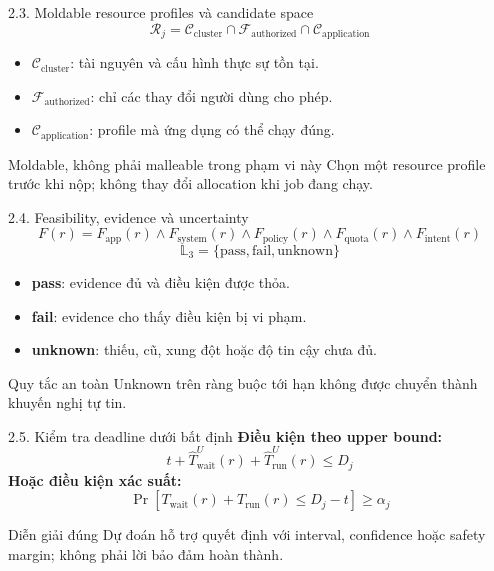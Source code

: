 \begin{frame}[t]{2.3. Moldable resource profiles và candidate space}
\small
\[
\mathcal{R}_j=
\mathcal{C}_{\mathrm{cluster}}
\cap
\mathcal{F}_{\mathrm{authorized}}
\cap
\mathcal{C}_{\mathrm{application}}
\]
\begin{itemize}
  \item $\mathcal{C}_{\mathrm{cluster}}$: tài nguyên và cấu hình thực sự tồn tại.
  \item $\mathcal{F}_{\mathrm{authorized}}$: chỉ các thay đổi người dùng cho phép.
  \item $\mathcal{C}_{\mathrm{application}}$: profile mà ứng dụng có thể chạy đúng.
\end{itemize}
\begin{block}{Moldable, không phải malleable trong phạm vi này}
Chọn một resource profile trước khi nộp; không thay đổi allocation khi job đang chạy.
\end{block}
\end{frame}

\begin{frame}[t]{2.4. Feasibility, evidence và uncertainty}
\small
\[
F(r)=F_{\mathrm{app}}(r)\land F_{\mathrm{system}}(r)\land
F_{\mathrm{policy}}(r)\land F_{\mathrm{quota}}(r)\land F_{\mathrm{intent}}(r)
\]
\[
\mathbb{L}_3=\{\mathrm{pass},\mathrm{fail},\mathrm{unknown}\}
\]
\begin{itemize}
  \item \textbf{pass}: evidence đủ và điều kiện được thỏa.
  \item \textbf{fail}: evidence cho thấy điều kiện bị vi phạm.
  \item \textbf{unknown}: thiếu, cũ, xung đột hoặc độ tin cậy chưa đủ.
\end{itemize}
\begin{alertblock}{Quy tắc an toàn}
Unknown trên ràng buộc tới hạn không được chuyển thành khuyến nghị tự tin.
\end{alertblock}
\end{frame}

\begin{frame}[t]{2.5. Kiểm tra deadline dưới bất định}
\small
\textbf{Điều kiện theo upper bound:}
\[
t+\widehat{T}_{\mathrm{wait}}^{U}(r)+\widehat{T}_{\mathrm{run}}^{U}(r)\le D_j
\]
\textbf{Hoặc điều kiện xác suất:}
\[
\Pr\!\left[T_{\mathrm{wait}}(r)+T_{\mathrm{run}}(r)\le D_j-t\right]\ge\alpha_j
\]
\begin{block}{Diễn giải đúng}
Dự đoán hỗ trợ quyết định với interval, confidence hoặc safety margin; không phải lời bảo đảm hoàn thành.
\end{block}
\end{frame}

